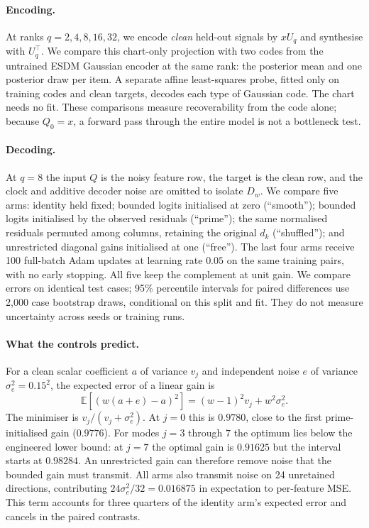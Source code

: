 \documentclass[11pt,a4paper]{article}
\newcommand{\U}{U_q}
\begin{document}
\paragraph{Encoding.}
At ranks $q=2,4,8,16,32$, we encode \emph{clean} held-out signals by
$x\U$ and synthesise with $\U^\top$. We compare this chart-only projection
with two codes from the untrained ESDM Gaussian encoder at the same rank:
the posterior mean and one posterior draw per item. A separate affine
least-squares probe, fitted only on training codes and clean targets,
decodes each type of Gaussian code. The chart needs no fit. These
comparisons measure recoverability from the code alone; because $Q_0=x$,
a forward pass through the entire model is not a bottleneck test.

\paragraph{Decoding.}
At $q=8$ the input $Q$ is the noisy feature row, the target is the clean row,
and the clock and additive decoder noise are omitted to isolate $D_w$.
We compare five arms: identity held fixed; bounded logits initialised at
zero (``smooth''); bounded logits initialised by the observed residuals
(``prime''); the same normalised residuals permuted among columns, retaining
the original $d_k$ (``shuffled''); and unrestricted diagonal gains
initialised at one (``free''). The last four arms receive 100 full-batch Adam
updates at learning rate $0.05$ on the same training pairs, with no early
stopping. All five keep the complement at unit gain. We compare errors
on identical test cases; 95\% percentile intervals for paired differences
use 2,000 case bootstrap draws, conditional on this split and fit. They
do not measure uncertainty across seeds or training runs.

\paragraph{What the controls predict.}
For a clean scalar coefficient $a$ of variance $v_j$ and independent noise
$e$ of variance $\sigma_e^2=0.15^2$, the expected error of a linear gain is
\[
 \mathbb E[(w(a+e)-a)^2]=(w-1)^2v_j+w^2\sigma_e^2.
\]
The minimiser is $v_j/(v_j+\sigma_e^2)$. At $j=0$ this is $0.9780$, close
to the first prime-initialised gain ($0.9776$). For modes $j=3$ through
$7$ the optimum lies below the engineered lower bound: at $j=7$ the
optimal gain is $0.91625$ but the interval starts at $0.98284$.
An unrestricted gain can therefore remove noise that the
bounded gain must transmit. All arms also transmit noise on 24 unretained
directions, contributing $24\sigma_e^2/32=0.016875$ in expectation to
per-feature MSE. This term accounts for three quarters of the identity
arm's expected error and cancels in the paired contrasts.
\end{document}
